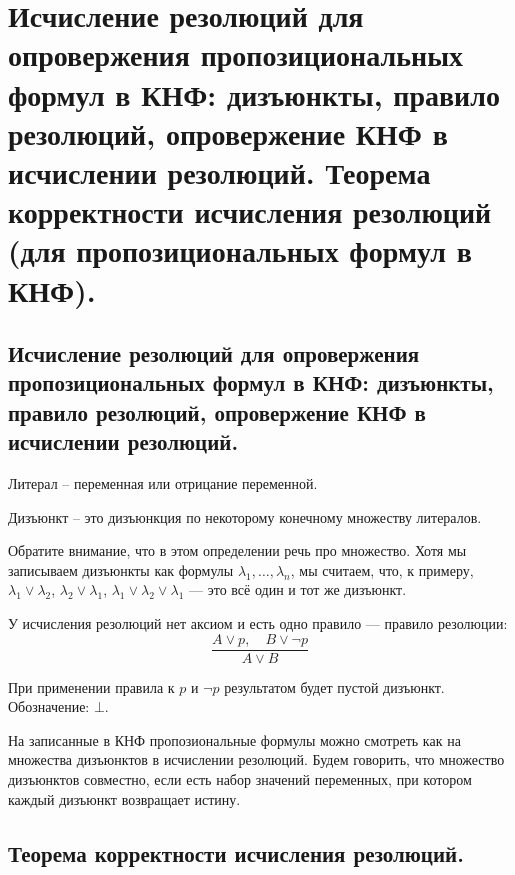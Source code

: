 \section{Исчисление резолюций для опровержения пропозициональных формул в КНФ: дизъюнкты, правило резолюций, опровержение КНФ в исчислении резолюций. Теорема корректности исчисления резолюций (для пропозициональных формул в КНФ).}

\subsection{Исчисление резолюций для опровержения пропозициональных формул в КНФ: дизъюнкты, правило резолюций, опровержение КНФ в исчислении резолюций.}

\begin{definition}
  Литерал -- переменная или отрицание переменной.
\end{definition}

\begin{definition}
  Дизъюнкт -- это дизъюнкция по некоторому конечному множеству литералов. 
\end{definition}

Обратите внимание, что в этом определении речь про множество. Хотя мы записываем дизъюнкты как формулы
$\lambda_1, \dots, \lambda_n$, мы считаем, что, к примеру, $\lambda_1 \vee \lambda_2$, $\lambda_2 \vee \lambda_1$, $\lambda_1 \vee \lambda_2 \vee \lambda_1$ — это всё один и тот же дизъюнкт. \newline

\begin{definition}
  У исчисления резолюций нет аксиом и есть одно правило — правило резолюции:
\[
  \frac{A \vee p, \quad B \vee \neg p}{A \vee B}
\]
\end{definition}

\begin{definition}
  При применении правила к $p$ и $\neg p$ результатом будет пустой дизъюнкт. Обозначение: $\bot$.
\end{definition}

\begin{definition}
  На записанные в КНФ пропозиональные формулы можно смотреть как на множества дизъюнктов в исчислении резолюций. Будем говорить, что множество дизъюнктов совместно, если есть набор значений переменных, при котором каждый дизъюнкт возвращает истину.
\end{definition}

\subsection{Теорема корректности исчисления резолюций.}

